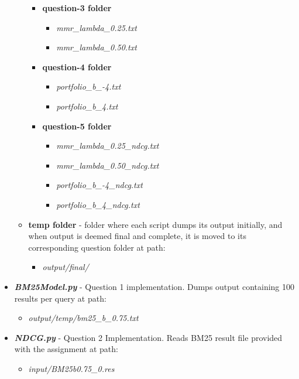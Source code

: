 \documentclass{article} %
\begin{document}
\begin{itemize}
\begin{itemize}
\begin{itemize}
            \item \textbf{question-3 folder}
            \begin{itemize}
                \item \textit{mmr\_lambda\_0.25.txt}
                \item \textit{mmr\_lambda\_0.50.txt}
            \end{itemize}
            \item \textbf{question-4 folder}
            \begin{itemize}
                \item \textit{portfolio\_b\_-4.txt}
                \item \textit{portfolio\_b\_4.txt}
            \end{itemize}
            \item \textbf{question-5 folder}
            \begin{itemize}
                \item \textit{mmr\_lambda\_0.25\_ndcg.txt}
                \item \textit{mmr\_lambda\_0.50\_ndcg.txt}
                \item \textit{portfolio\_b\_-4\_ndcg.txt}
                \item \textit{portfolio\_b\_4\_ndcg.txt}
            \end{itemize}
        \end{itemize}
        \item \textbf{temp folder} - folder where each script dumps its output initially, and when output is deemed final and complete, it is moved to its corresponding question folder at path: 
        \begin{itemize}
            \item \textit{output/final/}
        \end{itemize}
    \end{itemize}
    \item \textit{\textbf{BM25Model.py}} - Question 1 implementation. Dumps output containing 100 results per query at path: 
    \begin{itemize}
        \item \textit{output/temp/bm25\_b\_0.75.txt}
    \end{itemize}
    \item \textit{\textbf{NDCG.py}} - Question 2 Implementation. Reads BM25 result file provided with the assignment at path:
    \begin{itemize}
        \item \textit{input/BM25b0.75\_0.res}    

\end{itemize}
\end{itemize}
\end{document}
